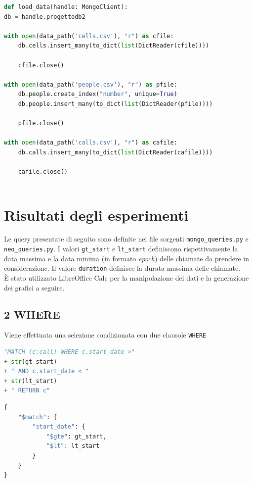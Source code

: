     \begin{lstlisting}[language=Python, caption=load\_data()]
def load_data(handle: MongoClient):
db = handle.progettodb2

with open(data_path('cells.csv'), "r") as cfile:
    db.cells.insert_many(to_dict(list(DictReader(cfile))))

    cfile.close()

with open(data_path('people.csv'), "r") as pfile:
    db.people.create_index("number", unique=True)
    db.people.insert_many(to_dict(list(DictReader(pfile))))

    pfile.close()

with open(data_path('calls.csv'), "r") as cafile:
    db.calls.insert_many(to_dict(list(DictReader(cafile))))

    cafile.close()
        
    \end{lstlisting}


\pagebreak
\section{Risultati degli esperimenti}
Le query presentate di seguito sono definite nei file sorgenti \texttt{mongo\_queries.py} e 
\texttt{neo\_queries.py}. I valori \texttt{gt\_start} e \texttt{lt\_start} definiscono
rispettivamente la data massima e la data minima (in formato \textit{epoch}) delle chiamate da prendere
in considerazione. Il valore \texttt{duration} definisce la durata massima delle chiamate.
\\
È stato utilizzato LibreOffice Calc per la manipolazione dei dati e
la generazione dei grafici a seguire.

    \subsection{2 WHERE}
    Viene effettuata una selezione condizionata con due clausole \texttt{WHERE}

    \begin{lstlisting}[language=Python, caption=Neo4j]
"MATCH (c:call) WHERE c.start_date >" 
+ str(gt_start) 
+ " AND c.start_date < " 
+ str(lt_start) 
+ " RETURN c"
    \end{lstlisting}

    \begin{lstlisting}[language=Python, caption=MongoDB]
{
    "$match": {
        "start_date": {
            "$gte": gt_start,
            "$lt": lt_start
        }
    }
}
    \end{lstlisting}

